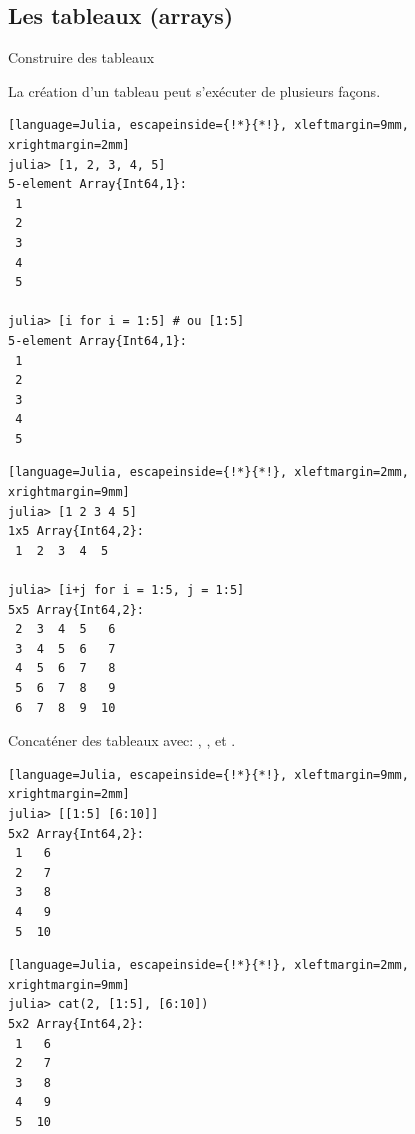 \subsection{Les tableaux (arrays)}
\begin{frame}[containsverbatim]{Construire des tableaux}
\par{La création d'un tableau peut s'exécuter de plusieurs façons.}
\vspace{-2ex}
\begin{multicols}{2}
\begin{lstlisting}[language=Julia, escapeinside={!*}{*!}, xleftmargin=9mm, xrightmargin=2mm]
julia> [1, 2, 3, 4, 5]
5-element Array{Int64,1}:
 1
 2
 3
 4
 5

julia> [i for i = 1:5] # ou [1:5]
5-element Array{Int64,1}:
 1
 2
 3
 4
 5
\end{lstlisting}
\columnbreak
\begin{lstlisting}[language=Julia, escapeinside={!*}{*!}, xleftmargin=2mm, xrightmargin=9mm]
julia> [1 2 3 4 5]
1x5 Array{Int64,2}:
 1  2  3  4  5

julia> [i+j for i = 1:5, j = 1:5]
5x5 Array{Int64,2}:
 2  3  4  5   6
 3  4  5  6   7
 4  5  6  7   8
 5  6  7  8   9
 6  7  8  9  10
\end{lstlisting}
\end{multicols}
\par{Concaténer des tableaux avec: , ,  et \cmdb{[}\cmdb{]}.}
\vspace{-2ex}
\begin{multicols}{2}
\begin{lstlisting}[language=Julia, escapeinside={!*}{*!}, xleftmargin=9mm, xrightmargin=2mm]
julia> [[1:5] [6:10]]
5x2 Array{Int64,2}:
 1   6
 2   7
 3   8
 4   9
 5  10
\end{lstlisting}
\begin{lstlisting}[language=Julia, escapeinside={!*}{*!}, xleftmargin=2mm, xrightmargin=9mm]
julia> cat(2, [1:5], [6:10])
5x2 Array{Int64,2}:
 1   6
 2   7
 3   8
 4   9
 5  10
\end{lstlisting}
\end{multicols}
\end{frame}


